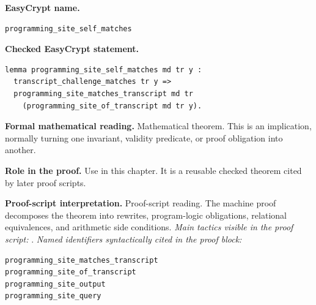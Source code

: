 \begin{formaltheorem}
\noindent\textbf{EasyCrypt name.}
\begin{lstlisting}[language=EasyCrypt,basicstyle=\ttfamily\scriptsize]
programming_site_self_matches
\end{lstlisting}
\noindent\textbf{Checked EasyCrypt statement.}
\begin{lstlisting}[language=EasyCrypt,basicstyle=\ttfamily\scriptsize]
lemma programming_site_self_matches md tr y :
  transcript_challenge_matches tr y =>
  programming_site_matches_transcript md tr
    (programming_site_of_transcript md tr y).
\end{lstlisting}
\noindent\textbf{Formal mathematical reading.}
Mathematical theorem. This is an implication, normally turning one invariant, validity predicate, or proof obligation into another.

\noindent\textbf{Role in the proof.}
Use in this chapter. It is a reusable checked theorem cited by later proof scripts.

\noindent\textbf{Proof-script interpretation.}
Proof-script reading. The machine proof decomposes the theorem into rewrites, program-logic obligations, relational equivalences, and arithmetic side conditions.
\emph{Main tactics visible in the proof script:} .
\emph{Named identifiers syntactically cited in the proof block:}
\begin{lstlisting}[language=EasyCrypt,basicstyle=\ttfamily\scriptsize]
programming_site_matches_transcript
programming_site_of_transcript
programming_site_output
programming_site_query
\end{lstlisting}

\end{formaltheorem}

